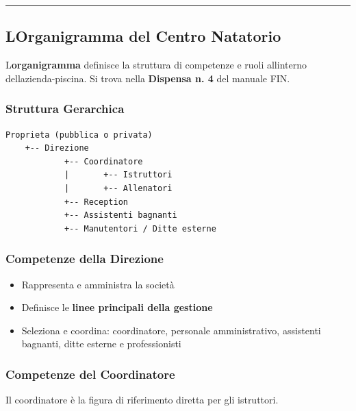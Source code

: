\documentclass[a4paper,11pt]{article}
\providecommand{\tightlist}{%
  \setlength{\itemsep}{0pt}\setlength{\parskip}{0pt}}
\begin{document}
\begin{center}\rule{0.5\linewidth}{0.5pt}\end{center}

\subsection{L\textquotesingle Organigramma del Centro
      Natatorio}\label{lorganigramma-del-centro-natatorio}

L\textquotesingle{}\textbf{organigramma} definisce la struttura di
competenze e ruoli all\textquotesingle interno
dell\textquotesingle azienda-piscina. Si trova nella \textbf{Dispensa n.
      4} del manuale FIN.

\subsubsection{Struttura Gerarchica}\label{struttura-gerarchica}

\begin{verbatim}
Proprieta (pubblica o privata)
    +-- Direzione
            +-- Coordinatore
            |       +-- Istruttori
            |       +-- Allenatori
            +-- Reception
            +-- Assistenti bagnanti
            +-- Manutentori / Ditte esterne
\end{verbatim}

\subsubsection{Competenze della
      Direzione}\label{competenze-della-direzione}

\begin{itemize}
      \tightlist
      \item
            Rappresenta e amministra la società
      \item
            Definisce le \textbf{linee principali della gestione}
      \item
            Seleziona e coordina: coordinatore, personale amministrativo,
            assistenti bagnanti, ditte esterne e professionisti
\end{itemize}

\subsubsection{Competenze del
      Coordinatore}\label{competenze-del-coordinatore}

Il coordinatore è la figura di riferimento diretta per gli istruttori.
\end{document}
